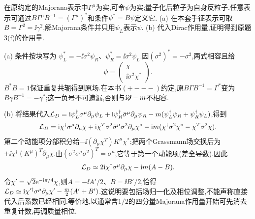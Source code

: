\begin{exercise}
在原约定的Majorana表示中$\Gamma^\mu$为实,可令$\psi$为实;量子化后粒子为自身反粒子.任意表示可通过$B\Gamma^\mu B^{-1}=(\Gamma^\mu)^*$和条件$\psi^*=B\psi$定义它.
(a) 在本套手征表示可取$B=\Gamma^2=\ii\gamma^2$,解Majorana条件并只用$\psi_L$表示$\psi$.
(b) 代入Dirac作用量,证明得到原题3(f)的作用量.
\end{exercise}
\begin{solution}
(a) 条件按块写为
$\psi_L^*=-\ii\sigma^2\psi_R$、$\psi_R^*=\ii\sigma^2\psi_L$.因$(\sigma^2)^*=-\sigma^2$,两式相容且给
\[
 \psi=\begin{pmatrix}\chi\\\ii\sigma^2\chi^*\end{pmatrix}.
\]
$B^*B=1$保证重复共轭得到原场.在本书$(+---)$约定,原$B\Gamma B^{-1}=\Gamma^*$变为$B\gamma B^{-1}=-\gamma^*$;这一负号不可遗漏,否则与$\mathrm i\mathord{\not\mathrel{\partial}}-m$不相容.

(b) 将结果代入$\mathcal L_D=\mathrm i\psi_L^\dagger\sigma^\mu\partial_\mu\psi_L+\mathrm i\psi_R^\dagger\bar\sigma^\mu\partial_\mu\psi_R-m(\psi_L^\dagger\psi_R+\psi_R^\dagger\psi_L)$,得到
\[
 \mathcal L_D=\mathrm i\chi^\dagger\sigma^\mu\partial_\mu\chi
 +\mathrm i\chi^T\sigma^2\bar\sigma^\mu\sigma^2\partial_\mu\chi^*
 -\mathrm i m(\chi^\dagger\sigma^2\chi^*-\chi^T\sigma^2\chi).
\]
第二个动能项分部积分给$-\ii(\partial_\mu\chi^T)K^\mu\chi^*$;把两个Grassmann场交换后为$+\ii\chi^\dagger(K^\mu)^T\partial_\mu\chi$.由$(\sigma^2\bar\sigma^\mu\sigma^2)^T=\sigma^\mu$,它等于第一个动能项(差全导数).因此
\[
 \mathcal L_D\simeq2\mathrm i\chi^\dagger\sigma^\mu\partial_\mu\chi
 -\mathrm i m(A-B).
\]
令$\chi'=\sqrt2\mathrm e^{-\mathrm i\pi/4}\chi$,则$A=-\ii A'/2$、$B=\ii B'/2$,恰得
$\mathcal L_D\simeq\mathrm i\chi'^\dagger\sigma^\mu\partial_\mu\chi'-\frac m2(A'+B')$.这说明要包括场归一化及相位调整,不能声称直接代入后系数已经相同.等价地,以通常含$1/2$的四分量Majorana作用量开始可先消去重复计数,再调质量相位.
\end{solution}

